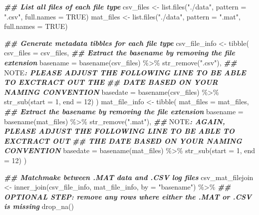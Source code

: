 \documentclass[
]{book}
\newenvironment{Shaded}{\begin{snugshade}}{\end{snugshade}}
\newcommand{\AlertTok}[1]{\textcolor[rgb]{0.94,0.16,0.16}{#1}}
\newcommand{\AttributeTok}[1]{\textcolor[rgb]{0.77,0.63,0.00}{#1}}
\newcommand{\ConstantTok}[1]{\textcolor[rgb]{0.00,0.00,0.00}{#1}}
\newcommand{\DecValTok}[1]{\textcolor[rgb]{0.00,0.00,0.81}{#1}}
\newcommand{\DocumentationTok}[1]{\textcolor[rgb]{0.56,0.35,0.01}{\textbf{\textit{#1}}}}
\newcommand{\FunctionTok}[1]{\textcolor[rgb]{0.00,0.00,0.00}{#1}}
\newcommand{\NormalTok}[1]{#1}
\newcommand{\OtherTok}[1]{\textcolor[rgb]{0.56,0.35,0.01}{#1}}
\newcommand{\SpecialCharTok}[1]{\textcolor[rgb]{0.00,0.00,0.00}{#1}}
\newcommand{\StringTok}[1]{\textcolor[rgb]{0.31,0.60,0.02}{#1}}
\begin{document}
\begin{Shaded}
\begin{Highlighting}[]
\DocumentationTok{\#\# List all files of each file type}
\NormalTok{csv\_files }\OtherTok{\textless{}{-}}
  \FunctionTok{list.files}\NormalTok{(}\StringTok{"./data"}\NormalTok{, }\AttributeTok{pattern =} \StringTok{".csv"}\NormalTok{,}
             \AttributeTok{full.names =} \ConstantTok{TRUE}\NormalTok{)}
\NormalTok{mat\_files }\OtherTok{\textless{}{-}}
  \FunctionTok{list.files}\NormalTok{(}\StringTok{"./data"}\NormalTok{, }\AttributeTok{pattern =} \StringTok{".mat"}\NormalTok{,}
             \AttributeTok{full.names =} \ConstantTok{TRUE}\NormalTok{)}

\DocumentationTok{\#\# Generate metadata tibbles for each file type}
\NormalTok{csv\_file\_info }\OtherTok{\textless{}{-}}
  \FunctionTok{tibble}\NormalTok{(}
    \AttributeTok{csv\_files =}\NormalTok{ csv\_files,}
    \DocumentationTok{\#\# Extract the basename by removing the file extension}
    \AttributeTok{basename =}  \FunctionTok{basename}\NormalTok{(csv\_files) }\SpecialCharTok{\%\textgreater{}\%} \FunctionTok{str\_remove}\NormalTok{(}\StringTok{".csv"}\NormalTok{),}
    \DocumentationTok{\#\# }\AlertTok{NOTE}\DocumentationTok{: PLEASE ADJUST THE FOLLOWING LINE TO BE ABLE TO EXCTRACT OUT THE}
    \DocumentationTok{\#\# DATE BASED ON YOUR NAMING CONVENTION}
    \AttributeTok{basedate =}  \FunctionTok{basename}\NormalTok{(csv\_files) }\SpecialCharTok{\%\textgreater{}\%} \FunctionTok{str\_sub}\NormalTok{(}\AttributeTok{start =} \DecValTok{1}\NormalTok{, }\AttributeTok{end =} \DecValTok{12}\NormalTok{)}
\NormalTok{  )}
\NormalTok{mat\_file\_info }\OtherTok{\textless{}{-}}
  \FunctionTok{tibble}\NormalTok{(}
    \AttributeTok{mat\_files =}\NormalTok{ mat\_files,}
    \DocumentationTok{\#\# Extract the basename by removing the file extension}
    \AttributeTok{basename =}  \FunctionTok{basename}\NormalTok{(mat\_files) }\SpecialCharTok{\%\textgreater{}\%} \FunctionTok{str\_remove}\NormalTok{(}\StringTok{".mat"}\NormalTok{),}
    \DocumentationTok{\#\# }\AlertTok{NOTE}\DocumentationTok{: AGAIN, PLEASE ADJUST THE FOLLOWING LINE TO BE ABLE TO EXCTRACT OUT}
    \DocumentationTok{\#\# THE DATE BASED ON YOUR NAMING CONVENTION}
    \AttributeTok{basedate =}  \FunctionTok{basename}\NormalTok{(mat\_files) }\SpecialCharTok{\%\textgreater{}\%} \FunctionTok{str\_sub}\NormalTok{(}\AttributeTok{start =} \DecValTok{1}\NormalTok{, }\AttributeTok{end =} \DecValTok{12}\NormalTok{)}
\NormalTok{  )}

\DocumentationTok{\#\# Matchmake between .MAT data and .CSV log files}
\NormalTok{csv\_mat\_filejoin }\OtherTok{\textless{}{-}}
  \FunctionTok{inner\_join}\NormalTok{(csv\_file\_info, mat\_file\_info, }\AttributeTok{by =} \StringTok{"basename"}\NormalTok{) }\SpecialCharTok{\%\textgreater{}\%}
  \DocumentationTok{\#\# OPTIONAL STEP: remove any rows where either the .MAT or .CSV is missing}
  \FunctionTok{drop\_na}\NormalTok{()}


\end{Highlighting}
\end{Shaded}
\end{document}
